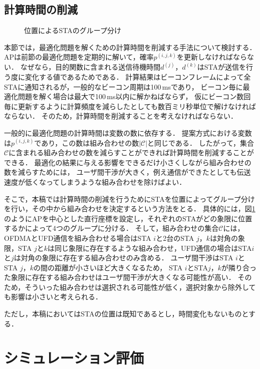 \documentclass[technicalreport]{ieicej}
\newcommand{\pijk}{p^{(i,j,k)}}
\newcommand{\mthc}{\mathcal C}
\begin{document}
	\subsection{計算時間の削減}\label{sec:time}
		\begin{figure}[t]
			\centering
			\caption{位置によるSTAのグループ分け}
			\label{fig:time_image}
		\end{figure}
		本節では，最適化問題を解くための計算時間を削減する手法について検討する．
		APは前節の最適化問題を定期的に解いて，確率$\pijk$を更新しなければならない．
		なぜなら，目的関数に含まれる送信待機時間$d^{(j)}$，$d^{(k)}$はSTAが送信を行う度に変化する値であるためである．
		計算結果はビーコンフレームによって全STAに通知されるが，一般的なビーコン周期は100\,msであり，
		ビーコン毎に最適化問題を解く場合は最大で100\,ms以内に解かねばならず，
		仮にビーコン数回毎に更新するように計算頻度を減らしたとしても数百ミリ秒単位で解けなければならない．
		そのため，計算時間を削減することを考えなければならない．
		\par
		一般的に最適化問題の計算時間は変数の数に依存する．
		提案方式における変数は$\pijk$であり，この数は組み合わせの数$|\mthc|$と同じである．
		したがって，集合$\mthc$に含まれる組み合わせの数を減らすことができれば計算時間を削減することができる．
		最適化の結果に与える影響をできるだけ小さくしながら組み合わせの数を減らすためには，
		ユーザ間干渉が大きく，例え通信ができたとしても伝送速度が低くなってしまうような組み合わせを除けばよい．
		\par
		そこで，本稿では計算時間の削減を行うためにSTAを位置によってグループ分けを行い，その中から組み合わせを決定するという方法をとる．
		具体的には，図\ref{fig:time_image}のようにAPを中心とした直行座標を設定し，それぞれのSTAがどの象限に位置するかによって4つのグループに分ける．
		そして，組み合わせの集合$\mthc$には，OFDMAとUFD通信を組み合わせる場合はSTA $i$と2台のSTA $j$，$k$は対角の象限，STA $j$と$k$は同じ象限に存在するような組み合わせ，UFD通信の場合はSTA$i$と$j$は対角の象限に存在する組み合わせのみ含める．
		ユーザ間干渉はSTA $i$とSTA $j$，$k$の間の距離が小さいほど大きくなるため，
		STA $i$とSTA$j$，$k$が隣り合った象限に存在する組み合わせはユーザ間干渉が大きくなる可能性が高い．
		そのため，そういった組み合わせは選択される可能性が低く，選択対象から除外しても影響は小さいと考えられる．
		\par
		ただし，本稿においてはSTAの位置は既知であるとし，時間変化もないものとする．


\section{シミュレーション評価}
\end{document}
